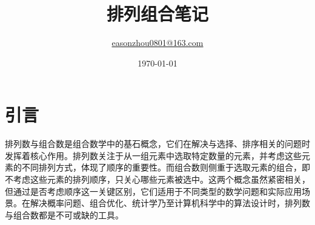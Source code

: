 \documentclass[a5paper]{article}
\title{\Huge \textbf{排列组合笔记}}
\author{\href{https://github.com/Zhou-Yi-Xuan}{easonzhou0801@163.com}}
\date{\today}
\begin{document}
\maketitle
\tableofcontents

\newpage
\section{引言}
排列数与组合数是组合数学中的基石概念，它们在解决与选择、排序相关的问题时发挥着核心作用。排列数关注于从一组元素中选取特定数量的元素，并考虑这些元素的不同排列方式，体现了顺序的重要性。而组合数则侧重于选取元素的组合，即不考虑这些元素的排列顺序，只关心哪些元素被选中。这两个概念虽然紧密相关，但通过是否考虑顺序这一关键区别，它们适用于不同类型的数学问题和实际应用场景。在解决概率问题、组合优化、统计学乃至计算机科学中的算法设计时，排列数与组合数都是不可或缺的工具。
\end{document}
